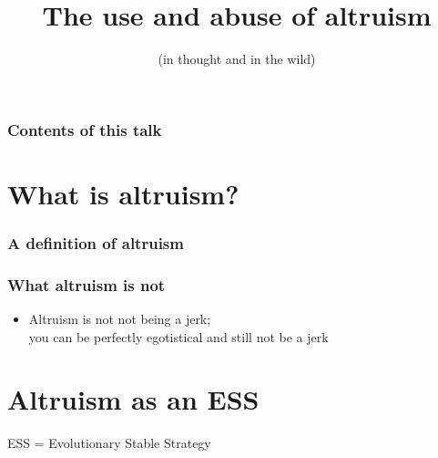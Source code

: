 \documentclass{beamer}
\begin{document}
\title{The use and abuse of altruism}
\subtitle{(in thought and in the wild)}

\begin{frame}
  \frametitle{Contents of this talk}
  \tableofcontents
\end{frame}

\section{What is altruism?}

\begin{frame}
  \frametitle{A definition of altruism}
\end{frame}

\begin{frame}
  \frametitle{What altruism is not}
  
  
  \begin{itemize}
    \item Altruism is not not being a jerk;\\ you can be perfectly egotistical and still not be a jerk
  \end{itemize}
\end{frame}

\section{Altruism as an ESS}

ESS = Evolutionary Stable Strategy

\begin{frame}
  \frametitle{}
\end{frame}
\end{document}
